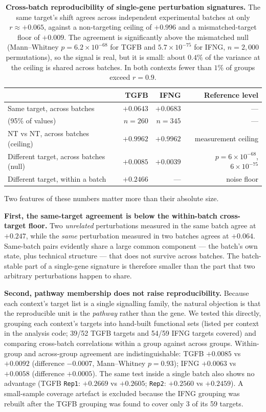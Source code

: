 \documentclass[11pt,a4paper]{article}
\begin{document}
\begin{table}[htbp]\centering\small
\begin{tabular}{@{}lrrr@{}}
\toprule
& \textbf{TGFB} & \textbf{IFNG} & \textbf{Reference level} \\
\midrule
Same target, across batches            & $+0.0643$ & $+0.0683$ & --- \\
\quad (95\% of values)                 & $n=260$   & $n=345$   & --- \\
NT vs NT, across batches (ceiling)     & $+0.9962$ & $+0.9962$ & measurement ceiling \\
Different target, across batches (null)& $+0.0085$ & $+0.0039$ & $p=6\times10^{-68}$, $6\times10^{-75}$ \\
Different target, within a batch       & $+0.2466$ & ---       & noise floor \\
\bottomrule
\end{tabular}
\caption{\textbf{Cross-batch reproducibility of single-gene perturbation signatures.} The same
target's shift agrees across independent experimental batches at only $r\approx+0.065$, against a
non-targeting ceiling of $+0.996$ and a mismatched-target floor of $+0.009$. The agreement is
significantly above the mismatched null (Mann--Whitney $p=6.2\times10^{-68}$ for TGFB and
$5.7\times10^{-75}$ for IFNG, $n=2{,}000$ permutations), so the signal is real, but it is small:
about $0.4\%$ of the variance at the ceiling is shared across batches. In both contexts fewer than
$1\%$ of groups exceed $r=0.9$.}
\end{table}

Two features of these numbers matter more than their absolute size.

\textbf{First, the same-target agreement is below the within-batch cross-target floor.} Two
\emph{unrelated} perturbations measured in the same batch agree at $+0.247$, while the \emph{same}
perturbation measured in two batches agrees at $+0.064$. Same-batch pairs evidently share a large
common component --- the batch's own state, plus technical structure --- that does not survive
across batches. The batch-stable part of a single-gene signature is therefore smaller than the
part that two arbitrary perturbations happen to share.

\textbf{Second, pathway membership does not raise reproducibility.} Because each context's target
list is a single signalling family, the natural objection is that the reproducible unit is the
\emph{pathway} rather than the gene. We tested this directly, grouping each context's targets into
hand-built functional sets (listed per context in the analysis code; 39/52 TGFB targets and 54/59
IFNG targets covered) and comparing cross-batch correlations within a group against across groups.
Within-group and across-group agreement are indistinguishable: TGFB $+0.0085$ vs $+0.0092$
(difference $-0.0007$, Mann--Whitney $p=0.93$); IFNG $+0.0063$ vs $+0.0058$ (difference $+0.0005$).
The same test inside a single batch also shows no advantage (TGFB \texttt{Rep1}: $+0.2669$ vs
$+0.2605$; \texttt{Rep2}: $+0.2560$ vs $+0.2459$). A small-sample coverage artefact is excluded
because the IFNG grouping was rebuilt after the TGFB grouping was found to cover only 3 of its 59
targets.
\end{document}
